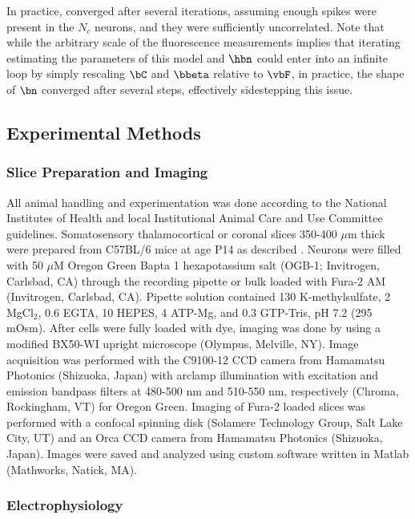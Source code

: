 In practice,  converged after several iterations, assuming enough spikes were present in the $N_c$ neurons, and they were sufficiently uncorrelated. Note that while the arbitrary scale of the fluorescence measurements implies that iterating estimating the parameters of this model and $\hbn$ could enter into an infinite loop by simply rescaling $\bC$ and $\bbeta$ relative to $\vbF$, in practice, the shape of $\bn$ converged after several steps, effectively sidestepping this issue.  




\subsection{Experimental Methods} \label{sec:exp}

\subsubsection{Slice Preparation and Imaging} 

All animal handling and experimentation was done according to the National Institutes of Health and local Institutional Animal Care and Use Committee guidelines. Somatosensory thalamocortical or coronal slices 350-400 $\mu$m thick were prepared from C57BL/6 mice at age P14 as described \cite{MacLeanYuste05}. Neurons were filled with 50 $\mu$M Oregon Green Bapta 1 hexapotassium salt (OGB-1; Invitrogen, Carlsbad, CA) through the recording pipette or bulk loaded with Fura-2 AM (Invitrogen, Carlsbad, CA). Pipette solution contained 130 K-methylsulfate, 2 MgCl$_2$, $0.6$ EGTA, 10 HEPES, 4 ATP-Mg, and $0.3$ GTP-Tris, pH 7.2 (295 mOsm).  After cells were fully loaded with dye, imaging was done by using a modified BX50-WI upright microscope (Olympus, Melville, NY).  Image acquisition was performed with the C9100-12 CCD camera from Hamamatsu Photonics (Shizuoka, Japan) with arclamp illumination with excitation and emission bandpass filters at 480-500 nm and 510-550 nm, respectively  (Chroma, Rockingham, VT) for Oregon Green. Imaging of Fura-2 loaded slices was performed with a confocal spinning disk (Solamere Technology Group, Salt Lake City, UT) and an Orca CCD camera from Hamamatsu Photonics (Shizuoka, Japan). Images were saved and analyzed using custom software written in Matlab (Mathworks, Natick, MA).

\subsubsection{Electrophysiology}


